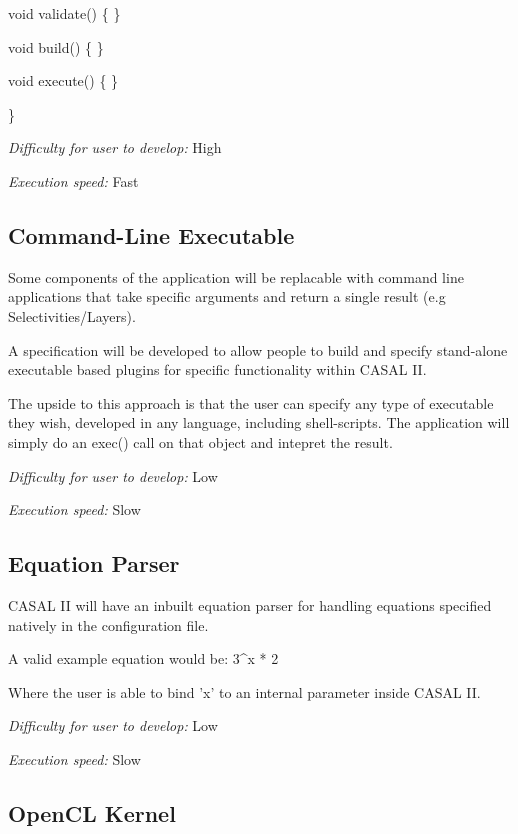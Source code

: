 \documentclass[a4paper,11pt,twoside,pdftex,draft]{article}
\begin{document}
void validate() \{ \}

void build() \{ \}

void execute() \{ \}

\}

\emph{Difficulty for user to develop:} High

\emph{Execution speed:} Fast

\hypertarget{command-line-executable}{%
\subsection[Command-Line
Executable]{\texorpdfstring{\protect\hypertarget{anchor-26}{}{}Command-Line
Executable}{Command-Line Executable}}\label{command-line-executable}}

Some components of the application will be replacable with command line
applications that take specific arguments and return a single result
(e.g Selectivities/Layers).

A specification will be developed to allow people to build and specify
stand-alone executable based plugins for specific functionality within
CASAL II.

The upside to this approach is that the user can specify any type of
executable they wish, developed in any language, including
shell-scripts. The application will simply do an exec() call on that
object and intepret the result.

\emph{Difficulty for user to develop:} Low

\emph{Execution speed:} Slow

\hypertarget{equation-parser-1}{%
\subsection[Equation
Parser]{\texorpdfstring{\protect\hypertarget{anchor-27}{}{}Equation
Parser}{Equation Parser}}\label{equation-parser-1}}

CASAL II will have an inbuilt equation parser for handling equations
specified natively in the configuration file.

A valid example equation would be: 3\^{}x * 2

Where the user is able to bind 'x' to an internal parameter inside CASAL
II.

\emph{Difficulty for user to develop:} Low

\emph{Execution speed:} Slow

\hypertarget{opencl-kernel}{%
\subsection[OpenCL
Kernel]{\texorpdfstring{\protect\hypertarget{anchor-28}{}{}OpenCL
Kernel}{OpenCL Kernel}}\label{opencl-kernel}}
\end{document}
